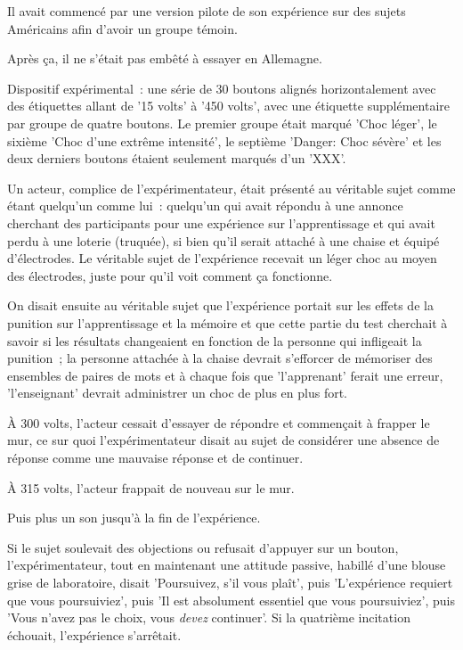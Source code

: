 Il avait commencé par une version pilote de son expérience sur des sujets Américains afin d'avoir un groupe témoin.

Après ça, il ne s'était pas embêté à essayer en Allemagne.

Dispositif expérimental~: une série de 30 boutons alignés horizontalement avec des étiquettes allant de '15 volts' à '450 volts', avec une étiquette supplémentaire par groupe de quatre boutons. Le premier groupe était marqué 'Choc léger', le sixième 'Choc d'une extrême intensité', le septième 'Danger: Choc sévère' et les deux derniers boutons étaient seulement marqués d'un 'XXX'.

Un acteur, complice de l'expérimentateur, était présenté au véritable sujet comme étant quelqu'un comme lui~: quelqu'un qui avait répondu à une annonce cherchant des participants pour une expérience sur l'apprentissage et qui avait perdu à une loterie (truquée), si bien qu'il serait attaché à une chaise et équipé d'électrodes. Le véritable sujet de l'expérience recevait un léger choc au moyen des électrodes, juste pour qu'il voit comment ça fonctionne.

On disait ensuite au véritable sujet que l'expérience portait sur les effets de la punition sur l'apprentissage et la mémoire et que cette partie du test cherchait à savoir si les résultats changeaient en fonction de la personne qui infligeait la punition~; la personne attachée à la chaise devrait s'efforcer de mémoriser des ensembles de paires de mots et à chaque fois que 'l'apprenant' ferait une erreur, 'l'enseignant' devrait administrer un choc de plus en plus fort.

À 300 volts, l'acteur cessait d'essayer de répondre et commençait à frapper le mur, ce sur quoi l'expérimentateur disait au sujet de considérer une absence de réponse comme une mauvaise réponse et de continuer.

À 315 volts, l'acteur frappait de nouveau sur le mur.

Puis plus un son jusqu'à la fin de l'expérience.

Si le sujet soulevait des objections ou refusait d'appuyer sur un bouton, l'expérimentateur, tout en maintenant une attitude passive, habillé d'une blouse grise de laboratoire, disait 'Poursuivez, s'il vous plaît', puis 'L'expérience requiert que vous poursuiviez', puis 'Il est absolument essentiel que vous poursuiviez', puis 'Vous n'avez pas le choix, vous \emph{devez} continuer'. Si la quatrième incitation échouait, l'expérience s'arrêtait.

